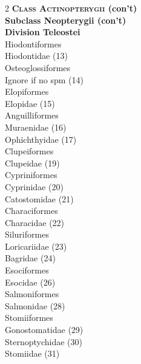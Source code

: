 \documentclass[12pt, hidelinks]{exam}
\newcommand{\onedent}{\hspace*{1em}}
\newcommand{\twodent}{\hspace*{2em}}
\begin{document}
\begin{multicols}{2}
\textbf{\textsc{Class Actinopterygii} (con't)}\\
\textbf{Subclass Neopterygii (con't)}\\
\hspace*{0.67em}\textbf{Division Teleostei}\\
\onedent Hiodontiformes\\
\twodent Hiodontidae (13)\\
\onedent Osteoglossiformes\\
\twodent Ignore if no spm (14)\\
\onedent Elopiformes\\
\twodent Elopidae (15)\\
\onedent Anguilliformes\\
\twodent Muraenidae (16)\\
\twodent Ophichthyidae (17)\\
\onedent Clupeiformes\\
\twodent Clupeidae (19)\\
\onedent Cypriniformes\\
\twodent Cyprinidae (20)\\
\twodent Catostomidae (21)\\
\onedent Characiformes\\
\twodent Characidae (22)\\
\onedent Siluriformes\\
\twodent Loricariidae (23)\\
\twodent Bagridae (24)\\
\onedent Esociformes\\
\twodent Esocidae (26)\\
\onedent Salmoniformes\\
\twodent Salmonidae (28)\\
\onedent Stomiiformes\\
\twodent Gonostomatidae (29)\\
\twodent Sternoptychidae (30)\\
\twodent Stomiidae (31)\\

\end{multicols}
\end{document}
